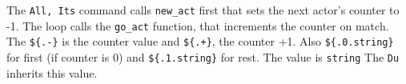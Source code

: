 The \texttt{All,\ Its} command calls \texttt{new\_act} first that sets
the next actor's counter to -1. The loop calls the \texttt{go\_act}
function, that increments the counter on match. The \texttt{\$\{.-\}} is
the counter value and \texttt{\$\{.+\}}, the counter +1. Also
\texttt{\$\{.0.string\}} for first (if counter is 0) and
\texttt{\$\{.1.string\}} for rest. The value is \texttt{string} The
\texttt{Du} inherits this value.

